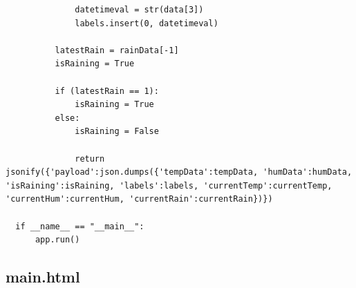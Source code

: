 \documentclass[10pt,a4paper]{article}
\begin{document}
\begin{verbatim}
              datetimeval = str(data[3])
              labels.insert(0, datetimeval)

          latestRain = rainData[-1]
          isRaining = True

          if (latestRain == 1):
              isRaining = True
          else:
              isRaining = False

              return jsonify({'payload':json.dumps({'tempData':tempData, 'humData':humData, 'isRaining':isRaining, 'labels':labels, 'currentTemp':currentTemp, 'currentHum':currentHum, 'currentRain':currentRain})})

  if __name__ == "__main__":
      app.run()
\end{verbatim}

\subsection{main.html}
\end{document}
